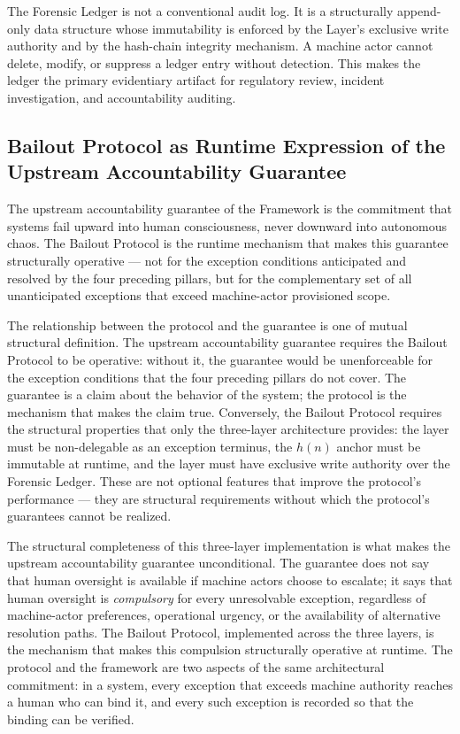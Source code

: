 The Forensic Ledger is not a conventional audit log. It is a structurally append-only data structure whose immutability is enforced by the \fact{} Layer's exclusive write authority and by the hash-chain integrity mechanism. A machine actor cannot delete, modify, or suppress a ledger entry without detection. This makes the ledger the primary evidentiary artifact for regulatory review, incident investigation, and accountability auditing.

\subsection{Bailout Protocol as Runtime Expression of the Upstream Accountability Guarantee}\label{sec:runtime-expression}

The upstream accountability guarantee of the \bxthree{} Framework is the commitment that \bxthree{} systems fail upward into human consciousness, never downward into autonomous chaos. The Bailout Protocol is the runtime mechanism that makes this guarantee structurally operative --- not for the exception conditions anticipated and resolved by the four preceding pillars, but for the complementary set of all unanticipated exceptions that exceed machine-actor provisioned scope.

The relationship between the protocol and the guarantee is one of mutual structural definition. The upstream accountability guarantee requires the Bailout Protocol to be operative: without it, the guarantee would be unenforceable for the exception conditions that the four preceding pillars do not cover. The guarantee is a claim about the behavior of the system; the protocol is the mechanism that makes the claim true. Conversely, the Bailout Protocol requires the structural properties that only the \bxthree{} three-layer architecture provides: the \purpose{} layer must be non-delegable as an exception terminus, the $h(n)$ anchor must be immutable at runtime, and the \fact{} layer must have exclusive write authority over the Forensic Ledger. These are not optional features that improve the protocol's performance --- they are structural requirements without which the protocol's guarantees cannot be realized.

The structural completeness of this three-layer implementation is what makes the upstream accountability guarantee unconditional. The guarantee does not say that human oversight is available if machine actors choose to escalate; it says that human oversight is \emph{compulsory} for every unresolvable exception, regardless of machine-actor preferences, operational urgency, or the availability of alternative resolution paths. The Bailout Protocol, implemented across the three \bxthree{} layers, is the mechanism that makes this compulsion structurally operative at runtime. The protocol and the framework are two aspects of the same architectural commitment: in a \bxthree{} system, every exception that exceeds machine authority reaches a human who can bind it, and every such exception is recorded so that the binding can be verified.

